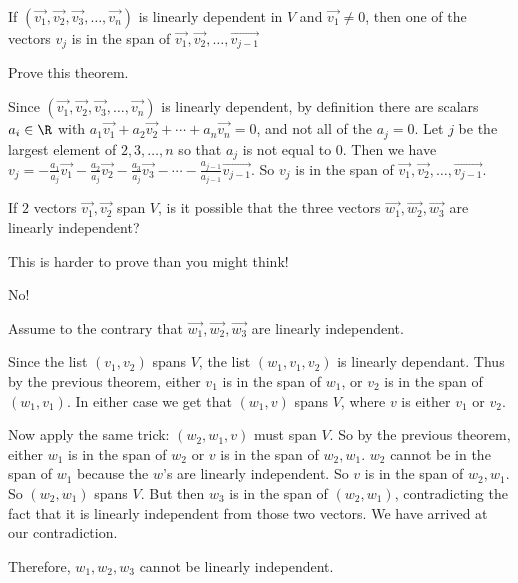 \documentclass{ximera}
\begin{document}
 \begin{theorem}
 	If $(\vec{v_1},\vec{v_2},\vec{v_3}, \ldots, \vec{v_n})$ is linearly dependent in $V$ and $\vec{v_1} \neq 0$, then one of the vectors $v_j$ is in the 
 	span of $\vec{v_1},\vec{v_2},\ldots,\vec{v_{j-1}}$
 \end{theorem}
 
Prove this theorem.

\begin{free-response}
 	Since $(\vec{v_1},\vec{v_2},\vec{v_3}, \ldots, \vec{v_n})$ is linearly dependent, by definition there are scalars $a_i \in \R$ with 
 	$a_1\vec{v_1}+a_2\vec{v_2}+ \cdots +a_n\vec{v_n} = 0$, and not all of the $a_j =0$.  Let $j$ be the largest element of ${2,3,\ldots,n}$ so that $a_j$ is not equal to $0$.
 	Then we have 
 	$v_j = -\frac{a_1}{a_j}\vec{v_1}-\frac{a_2}{a_j}\vec{v_2} -\frac{a_3}{a_j}\vec{v_3} - \cdots -\frac{a_{j-1}}{a_{j-1}}\vec{v_{j-1}}$.
 	So $v_j$ is in the span of $\vec{v_1},\vec{v_2},\ldots,\vec{v_{j-1}}$.
 \end{free-response}
 
 
 	If $2$ vectors $\vec{v_1},\vec{v_2}$ span $V$, is it possible that the three vectors $\vec{w_1},\vec{w_2},\vec{w_3}$ are linearly independent?
 	
 	\begin{warning}
 		This is harder to prove than you might think!
 	\end{warning}
\begin{free-response}
	No!
	
	Assume to the contrary that $\vec{w_1},\vec{w_2},\vec{w_3}$ are linearly independent.
	
	Since the list $(v_1,v_2)$ spans $V$, the list $(w_1,v_1,v_2)$ is linearly dependant.  Thus by the previous theorem, either $v_1$ is in the span of $w_1$,
	or $v_2$ is in the span of $(w_1,v_1)$.  In either case we get that $(w_1,v)$ spans $V$, where $v$ is either $v_1$ or $v_2$.
	
	Now apply the same trick:  $(w_2,w_1,v)$ must span $V$.  So by the previous theorem, either $w_1$ is in the span of $w_2$ or $v$ is in the span of $w_2,w_1$.  
	$w_2$ cannot be in the span of $w_1$ because the $w$'s are linearly independent.  So $v$ is in the span of $w_2,w_1$.  So $(w_2,w_1)$ spans $V$.  But then
	$w_3$ is in the span of $(w_2,w_1)$, contradicting the fact that it is linearly independent from those two vectors.  We have arrived at our contradiction.
	
	Therefore, $w_1,w_2,w_3$ cannot be linearly independent.
\end{free-response}
\end{document}
